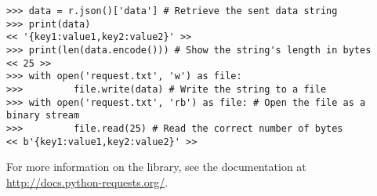\begin{lstlisting}
>>> data = r.json()['data'] # Retrieve the sent data string
>>> print(data)
<< '{key1:value1,key2:value2}' >>
>>> print(len(data.encode())) # Show the string's length in bytes
<< 25 >>
>>> with open('request.txt', 'w') as file:
>>>         file.write(data) # Write the string to a file
>>> with open('request.txt', 'rb') as file: # Open the file as a binary stream
>>>         file.read(25) # Read the correct number of bytes
<< b'{key1:value1,key2:value2}' >>
\end{lstlisting}

For more information on the  library, see the documentation at \url{http://docs.python-requests.org/}.

\begin{comment}
\begin{problem}
Expand the functionality of your new file from the previous problem to accept a PUT request with attached data as a JSON string.
The inputed string should be loaded and inserted into the \li{data} dictionary as new dictionary keys and values.

Hints: All HTTP server functions must send a status code and a header back to the client.
The class used in \texttt{waterserver.py} has a class attribute named \li{self.rfile} to read data inputs from the client.
The \li{self.rfile} attribute is a buffered binary stream that can be read using the \li{read()} function.
As previously demonstrated, the read function will only read as many bytes as it is instructed to.
Consider using the \li{self.headers['Content-Length']} attribute to find the number of bytes to read.
\end{problem}

These problems have illustrated a simple mechanism for data distribution using the main HTTP requests for website communication.
The file created effectuates an online database that can be requested for information with HTTP protocols and JSON serialization.
\end{comment}
